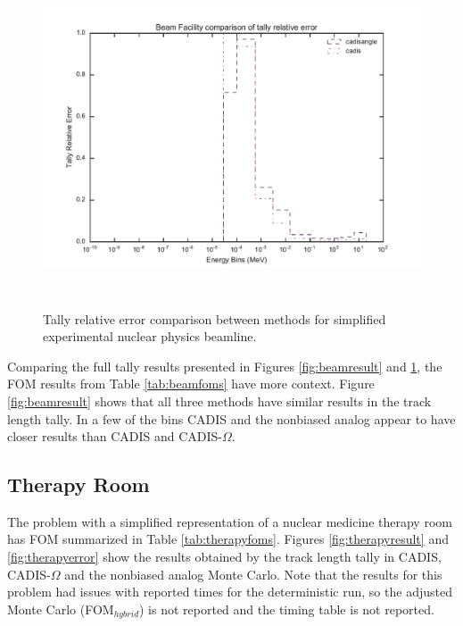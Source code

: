 \begin{figure}[h!]
  \centering
  \includegraphics[height=10cm]{./chapters/characterization_probs/figures/char/beam/beam_facility_tally_error_compare.pdf}
  \caption[Tally relative error comparison between methods
    for simplified experimental nuclear physics beamline.]
  {Tally relative error comparison between methods for simplified experimental
    nuclear physics beamline.}
  \label{fig:beamerror}
\end{figure}

Comparing the full tally results presented in Figures \ref{fig:beamresult} and
\ref{fig:beamerror}, the FOM results from Table \ref{tab:beamfoms} have more
context. Figure \ref{fig:beamresult} shows that all three methods have similar
results in the track length tally. In a few of the bins CADIS and the nonbiased
analog appear to have closer results than CADIS and CADIS-$\Omega$.

\subsection{Therapy Room}
\label{subsec:resultstherapy}

The problem with a simplified representation of a nuclear medicine therapy room
has FOM summarized in Table
\ref{tab:therapyfoms}. Figures
\ref{fig:therapyresult} and \ref{fig:therapyerror} show the results obtained
by the track length tally in CADIS, CADIS-$\Omega$ and the nonbiased analog
Monte Carlo. Note that the results for this problem had issues with reported
times for the deterministic run, so the adjusted Monte Carlo
(FOM$_{hybrid}$) is not reported and the timing table is not reported.

